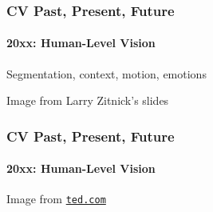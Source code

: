 \documentclass[xetex,professionalfont]{beamer}
\begin{document}
\begin{frame}
\frametitle{CV Past, Present, Future}
\framesubtitle{20xx: Human-Level Vision}

Segmentation, context, motion, emotions

\bigskip
\begin{center}
    {\centering Image from Larry Zitnick's slides}
\end{center}

\end{frame}


\begin{frame}
\frametitle{CV Past, Present, Future}
\framesubtitle{20xx: Human-Level Vision}


\bigskip
\begin{center}
    {\centering Image from \href{https://www.ted.com/talks/fei_fei_li_how_we_re_teaching_computers_to_understand_pictures}{\texttt{ted.com}}}
\end{center}

\end{frame}


{
\begin{frame}


\end{frame}
}
\end{document}
